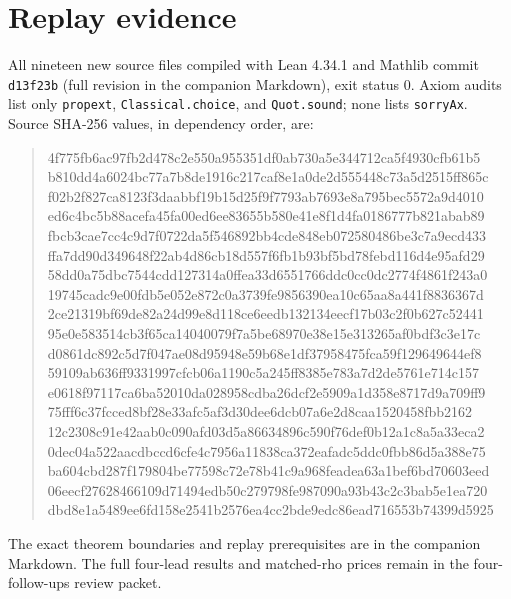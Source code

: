 \documentclass[10pt]{article}
\begin{document}
\section*{Replay evidence}
All nineteen new source files compiled with Lean 4.34.1 and Mathlib commit \texttt{d13f23b} (full revision in the companion Markdown), exit status 0. Axiom audits list only \texttt{propext}, \texttt{Classical.choice}, and \texttt{Quot.sound}; none lists \texttt{sorryAx}. Source SHA-256 values, in dependency order, are:
\begin{quote}\scriptsize\ttfamily
4f775fb6ac97fb2d478c2e550a955351df0ab730a5e344712ca5f4930cfb61b5\\
b810dd4a6024bc77a7b8de1916c217caf8e1a0de2d555448c73a5d2515ff865c\\
f02b2f827ca8123f3daabbf19b15d25f9f7793ab7693e8a795bec5572a9d4010\\
ed6c4bc5b88acefa45fa00ed6ee83655b580e41e8f1d4fa0186777b821abab89\\
fbcb3cae7cc4c9d7f0722da5f546892bb4cde848eb072580486be3c7a9ecd433\\
ffa7dd90d349648f22ab4d86cb18d557f6fb1b93bf5bd78febd116d4e95afd29\\
58dd0a75dbc7544cdd127314a0ffea33d6551766ddc0cc0dc2774f4861f243a0\\
19745cadc9e00fdb5e052e872c0a3739fe9856390ea10c65aa8a441f8836367d\\
2ce21319bf69de82a24d99e8d118ce6eedb132134eecf17b03c2f0b627c52441\\
95e0e583514cb3f65ca14040079f7a5be68970e38e15e313265af0bdf3c3e17c\\
d0861dc892c5d7f047ae08d95948e59b68e1df37958475fca59f129649644ef8\\
59109ab636ff9331997cfcb06a1190c5a245ff8385e783a7d2de5761e714c157\\
e0618f97117ca6ba52010da028958cdba26dcf2e5909a1d358e8717d9a709ff9\\
75fff6c37fcced8bf28e33afc5af3d30dee6dcb07a6e2d8caa1520458fbb2162\\
12c2308c91e42aab0c090afd03d5a86634896c590f76def0b12a1c8a5a33eca2\\
0dec04a522aacdbccd6cfe4c7956a11838ca372eafadc5ddc0fbb86d5a388e75\\
ba604cbd287f179804be77598c72e78b41c9a968feadea63a1bef6bd70603eed\\
06eecf27628466109d71494edb50c279798fe987090a93b43c2c3bab5e1ea720\\
dbd8e1a5489ee6fd158e2541b2576ea4cc2bde9edc86ead716553b74399d5925
\end{quote}
The exact theorem boundaries and replay prerequisites are in the companion Markdown. The full four-lead results and matched-rho prices remain in the four-follow-ups review packet.
\end{document}
